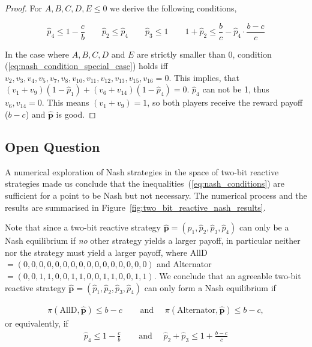 \documentclass{article}
\theoremstyle{definition}
\begin{document}
\begin{proof}
    For \(A, B, C, D, E \leq 0\) we derive the following conditions,
    \vspace{-.5cm}

    \begin{equation}\label{eq:nash_conditions}
    \hat{p}_4  \leq 1 - \frac{c}{b} \qquad
    \hat{p}_2  \leq \hat{p}_4 \qquad
    \hat{p}_3  \leq 1 \qquad
    1 + \hat{p}_2 \leq \frac{b}{c} - \hat{p}_4 \cdot \frac{b\!-\!c}{c}
    \end{equation}

    In the case where \(A, B, C, D\) and \(E\) are strictly smaller than 0, condition
    (\ref{eq:nash_condition_special_case}) holds iff \(v_2, v_3,
    v_4, v_5, v_7, v_8, v_{10},
    v_{11}, \allowbreak v_{12}, v_{13}, v_{15}, v_{16} =
    0\). This implies, that \((v_1 + v_9) (1 - \hat{p}_1) + (v_6 +
    v_{14}) (1 - \hat{p}_4) = 0\). \(\hat{p}_4\) can not be 1, thus \(v_6,
    v_{14} = 0\). This means \((v_1 + v_9) = 1\), so both
    players receive the reward payoff (\(b - c\)) and \(\mathbf{\hat{p}}\) is good.
\end{proof}

\subsection{Open Question}

A numerical exploration of Nash strategies in the space of two-bit reactive
strategies made us conclude that the inequalities~(\ref{eq:nash_conditions}) are
sufficient for a point to be Nash but not necessary. The numerical process and
the results are summarised in Figure~\ref{fig:two_bit_reactive_nash_results}.

Note that since a two-bit reactive strategy \(\mathbf{\hat{p}} = (\hat{p}_{1},
\hat{p}_{2}, \hat{p}_{3}, \hat{p}_{4})\) can only be a Nash equilibrium if {\it no} other strategy yields a larger payoff,  in particular neither  nor the  strategy must yield a larger payoff, where
AllD\(=(0, 0, 0, 0, 0, 0, 0, 0, 0, 0, 0, 0, 0, 0, 0, 0)\) and
Alternator\(=(0, 0, 1, 1, 0, 0, 1, 1, 0, 0, 1, 1, 0, 0, 1, 1)\).
We conclude that an agreeable two-bit reactive strategy  \(\mathbf{\hat{p}} = (\hat{p}_{1}, \hat{p}_{2}, \hat{p}_{3}, \hat{p}_{4})\) can only form a Nash equilibrium if 

\begin{align*}
\pi(\text{AllD}, \mathbf{\hat{p}}) \leq b\!-\!c & \quad \text{ and } \quad \pi(\text{Alternator}, \mathbf{\hat{p}}) \leq b\!-\!c,
\end{align*}
or equivalently, if
\begin{align}\label{Eq:NashConditionDonationGame}
  \hat{p}_4 \leq 1 - \frac{c}{b} & \quad \text{ and } \quad  \hat{p}_2 + \hat{p}_3 \leq 1 + \frac{b\!-\!c}{c}
\end{align}
\end{document}
